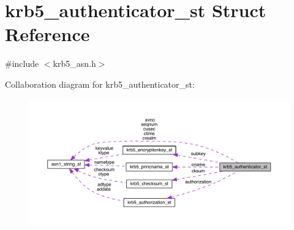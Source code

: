 \hypertarget{structkrb5__authenticator__st}{}\section{krb5\+\_\+authenticator\+\_\+st Struct Reference}
\label{structkrb5__authenticator__st}


{\ttfamily \#include $<$krb5\+\_\+asn.\+h$>$}



Collaboration diagram for krb5\+\_\+authenticator\+\_\+st\+:\nopagebreak
\begin{figure}[H]
\begin{center}
\leavevmode
\includegraphics[width=350pt]{structkrb5__authenticator__st__coll__graph}
\end{center}
\end{figure}

